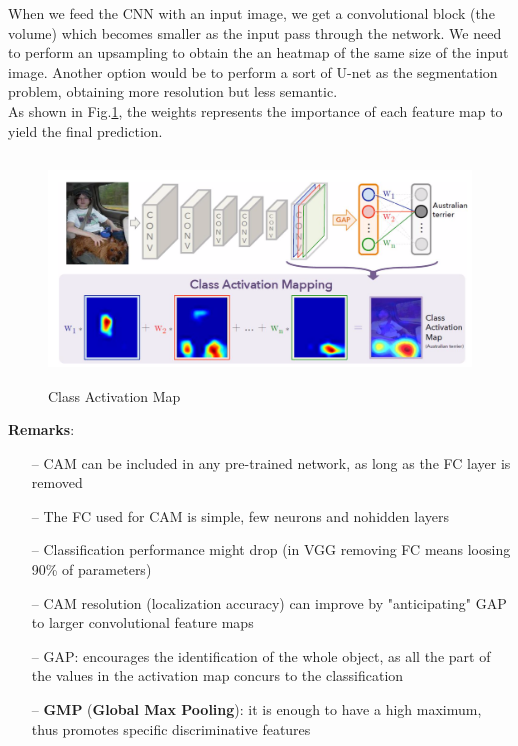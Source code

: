 When we feed the CNN with an input image, we get a convolutional block (the volume) which becomes smaller as the input pass through the network. We need to perform an upsampling to obtain the an heatmap of the same size of the input image. Another option would be to perform a sort of U-net as the segmentation problem, obtaining more resolution but less semantic. \\
As shown in Fig.\ref{fig:cam}, the weights represents the importance of each feature map to yield the final prediction.

 \begin{figure}[h]
    \centering
    \includegraphics[width=15cm, height=6cm]{images/cam.png}
    \caption{Class Activation Map}
    \label{fig:cam}
\end{figure}
\textbf{Remarks}:
\begin{itemize}
    \item[--] CAM can be included in any pre-trained network, as long as the FC layer is removed
    \item[--] The FC used for CAM is simple, few neurons and nohidden layers
    \item[--] Classification performance might drop (in VGG removing FC means loosing 90\% of  parameters)
    \item[--] CAM resolution (localization accuracy) can improve by "anticipating" GAP to larger convolutional feature maps
    \item[--] GAP: encourages the identification of the whole object, as all the part of the values in the activation map concurs to the classification 
    \item[--] \textbf{GMP} (\textbf{Global Max Pooling}): it is enough to have a high maximum, thus promotes specific discriminative features
\end{itemize}{}

